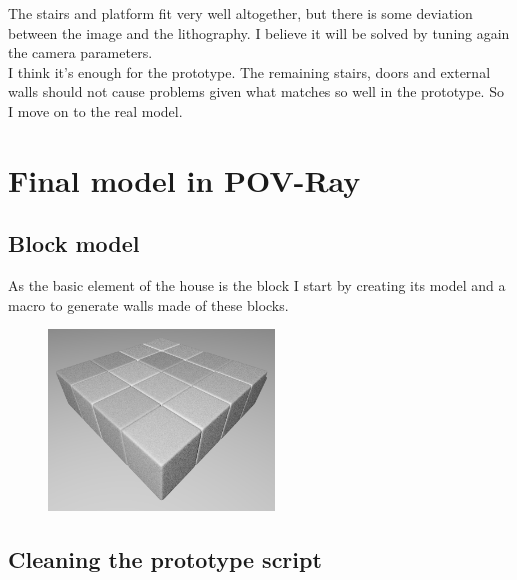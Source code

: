 \documentclass[12pt, a4paper]{article}
\begin{document}
The stairs and platform fit very well altogether, but there is some deviation between the image and the lithography. I believe it will be solved by tuning again the camera parameters.\\

I think it's enough for the prototype. The remaining stairs, doors and external walls should not cause problems given what matches so well in the prototype. So I move on to the real model.\\

\section{Final model in POV-Ray}

\subsection{Block model}

As the basic element of the house is the block I start by creating its model and a macro to generate walls made of these blocks.\\

\begin{scriptsize}
\begin{ttfamily}

\end{ttfamily}
\end{scriptsize}

\begin{center}
\begin{figure}[H]
\centering
\includegraphics[width=6cm]{./block_1.png}\\
\end{figure}
\end{center}

\subsection{Cleaning the prototype script}
\end{document}

